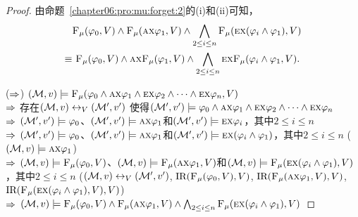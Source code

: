 \begin{proof}
	由命题~\ref{chapter06:pro:mu:forget:2}的(i)和(ii)可知，
	\begin{align*}
		& {\textsc{F}_{\textsc{$\mu$}}}(\varphi_0, V) \wedge {\textsc{F}_{\textsc{$\mu$}}}(\textsc{a}\textsc{x} \varphi_1, V) \wedge \bigwedge_{2\leq i\leq n}  {\textsc{F}_{\textsc{$\mu$}}}(\textsc{e}\textsc{x}(\varphi_i \wedge \varphi_1), V)\\
		\equiv &\  {\textsc{F}_{\textsc{$\mu$}}}(\varphi_0, V) \wedge \textsc{a}\textsc{x}{\textsc{F}_{\textsc{$\mu$}}}(\varphi_1, V) \wedge \bigwedge_{2\leq i\leq n} \textsc{e}\textsc{x} {\textsc{F}_{\textsc{$\mu$}}}(\varphi_i \wedge \varphi_1, V).
	\end{align*}
	
	($\Rightarrow$) $({\cal M},v) \models {\textsc{F}_{\textsc{$\mu$}}}(\varphi_0 \wedge \textsc{a}\textsc{x} \varphi_1 \wedge \textsc{e}\textsc{x} \varphi_2 \wedge \dots \wedge \textsc{e} \textsc{x} \varphi_n,V)$ \\
	$\Rightarrow$ 存在$({\cal M}, v) \leftrightarrow_V ({\cal M}', v')$ 使得$({\cal M}',v') \models \varphi_0 \wedge \textsc{a}\textsc{x} \varphi_1 \wedge \textsc{e}\textsc{x} \varphi_2 \wedge \dots \wedge \textsc{e} \textsc{x} \varphi_n$\\
	$\Rightarrow$ $({\cal M}',v') \models \varphi_0$、$({\cal M}', v') \models \textsc{a}\textsc{x} \varphi_1$和$({\cal M}',v') \models \textsc{e}\textsc{x} \varphi_i$，其中$2\leq i \leq n$\\
	$\Rightarrow$ $({\cal M}',v') \models \varphi_0$、$({\cal M}', v') \models \textsc{a}\textsc{x} \varphi_1$和$({\cal M}',v') \models \textsc{e}\textsc{x} (\varphi_i \wedge \varphi_1)$，其中$2\leq i \leq n$ \hfill ($({\cal M},v) \models \textsc{a}\textsc{x} \varphi_1$)\\
	$\Rightarrow$ $({\cal M},v) \models {\textsc{F}_{\textsc{$\mu$}}}(\varphi_0,V)$、$({\cal M}, v) \models {\textsc{F}_{\textsc{$\mu$}}}(\textsc{a}\textsc{x} \varphi_1, V)$和$({\cal M},v) \models {\textsc{F}_{\textsc{$\mu$}}}(\textsc{e}\textsc{x} (\varphi_i \wedge \varphi_1), V)$，其中$2\leq i \leq n$ \quad ($({\cal M}, v) \leftrightarrow_V ({\cal M}', v')$, $\textrm{IR}({\textsc{F}_{\textsc{$\mu$}}}(\varphi_0,V),V)$, $\textrm{IR}({\textsc{F}_{\textsc{$\mu$}}}(\textsc{a}\textsc{x} \varphi_1, V), V)$, $\textrm{IR}({\textsc{F}_{\textsc{$\mu$}}}(\textsc{e}\textsc{x} (\varphi_i \wedge \varphi_1), V), V)$)\\
	$\Rightarrow$ $({\cal M},v) \models {\textsc{F}_{\textsc{$\mu$}}}(\varphi_0, V) \wedge {\textsc{F}_{\textsc{$\mu$}}}(\textsc{a}\textsc{x} \varphi_1, V) \wedge \bigwedge_{2\leq i\leq n}  {\textsc{F}_{\textsc{$\mu$}}}(\textsc{e}\textsc{x}(\varphi_i \wedge \varphi_1), V)$
	

\end{proof}
